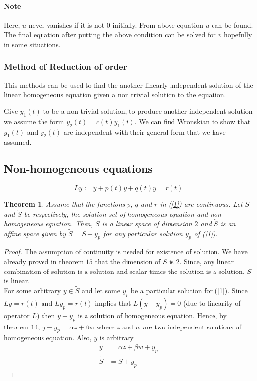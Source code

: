 \documentclass[12pt,reqno]{amsart}
\theoremstyle{plain}
\newtheorem{thm}{Theorem}
\theoremstyle{definition}
\begin{document}
\paragraph{\bf Note} Here, $u$ never vanishes if it is not $0$ initially. From above equation $u$ can be found.
The final equation after putting the above condition can be solved for $v$ hopefully in some situations.

\subsubsection{\bf Method of Reduction of order} This methods can be used to find the another linearly independent solution of the linear homogeneous equation given a non trivial solution to the equation.
\par Give $y_1(t)$ to be a non-trivial solution, to produce another independent solution we assume the form $y_2(t) = c(t)y_1(t)$. We can find Wronskian to show that $y_1(t)$ and $y_2(t)$ are independent with their general form that we have assumed.

\subsection{Non-homogeneous equations}
\begin{equation}\label{1}
    Ly := \ddot{y} + p(t)\dot{y} + q(t)y = r(t)
\end{equation}
\begin{thm}
    Assume that the functions $p$, $q$ and $r$ in (\ref{1}) are continuous. Let $S$ and $\tilde{S}$ be respectively, the solution set of homogeneous equation and non homogeneous equation. Then, $S$ is a linear space of dimension $2$ and $\tilde{S}$ is an affine space given by $\tilde{S} = S + y_p$ for any particular solution $y_p$ of (\ref{1}).
\end{thm}
\begin{proof}
    The assumption of continuity is needed for existence of solution. We have already proved in theorem $15$ that the dimension of $S$ is $2$. Since, any linear combination of solution is a solution and scalar times the solution is a solution, $S$ is linear.\\
    For some arbitrary $y \in \tilde{S}$ and let some $y_p$ be a particular solution for (\ref{1}). Since $Ly = r(t)$ and $Ly_p = r(t)$ implies that $L(y-y_p) = 0$ (due to linearity of operator $L$) then $y - y_p$ is a solution of homogeneous equation. Hence, by theorem $14$, $y - y_p = \alpha z + \beta w$ where $z$ and $w$ are two independent solutions of homogeneous equation. Also, $y$ is arbitrary
    \begin{align*}
        y &= \alpha z + \beta w + y_p\\
        \tilde{S} &= S + y_p        
    \end{align*}
\end{proof}
\end{document}

